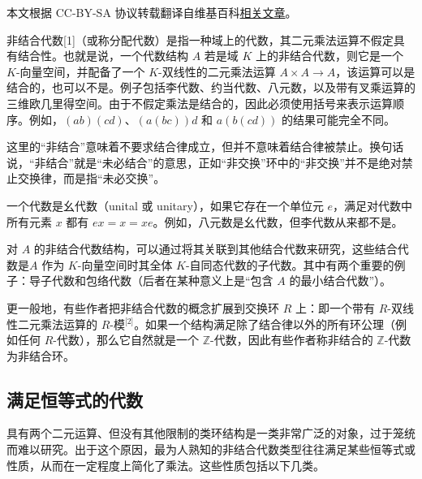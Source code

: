 
本文根据 CC-BY-SA 协议转载翻译自维基百科\href{https://en.wikipedia.org/wiki/Non-associative_algebra}{相关文章}。

非结合代数[1]（或称分配代数）是指一种域上的代数，其二元乘法运算不假定具有结合性。也就是说，一个代数结构 $A$ 若是域 $K$ 上的非结合代数，则它是一个 $K$-向量空间，并配备了一个 $K$-双线性的二元乘法运算 $A \times A \to A$，该运算可以是结合的，也可以不是。例子包括李代数、约当代数、八元数，以及带有叉乘运算的三维欧几里得空间。由于不假定乘法是结合的，因此必须使用括号来表示运算顺序。例如，$(ab)(cd)$、$(a(bc))d$ 和 $a(b(cd))$ 的结果可能完全不同。

这里的“非结合”意味着不要求结合律成立，但并不意味着结合律被禁止。换句话说，“非结合”就是“未必结合”的意思，正如“非交换”环中的“非交换”并不是绝对禁止交换律，而是指“未必交换”。

一个代数是幺代数（unital 或 unitary），如果它存在一个单位元 $e$，满足对代数中所有元素 $x$ 都有 $ex = x = xe$。例如，八元数是幺代数，但李代数从来都不是。

对 $A$ 的非结合代数结构，可以通过将其关联到其他结合代数来研究，这些结合代数是$A$ 作为 $K$-向量空间时其全体 $K$-自同态代数的子代数。其中有两个重要的例子：导子代数和包络代数（后者在某种意义上是“包含 $A$ 的最小结合代数”）。

更一般地，有些作者把非结合代数的概念扩展到交换环 $R$ 上：即一个带有 $R$-双线性二元乘法运算的 $R$-模\(^\text{[2]}\)。如果一个结构满足除了结合律以外的所有环公理（例如任何 $R$-代数），那么它自然就是一个 $\mathbb{Z}$-代数，因此有些作者称非结合的 $\mathbb{Z}$-代数为非结合环。
\subsection{满足恒等式的代数}
具有两个二元运算、但没有其他限制的类环结构是一类非常广泛的对象，过于笼统而难以研究。出于这个原因，最为人熟知的非结合代数类型往往满足某些恒等式或性质，从而在一定程度上简化了乘法。这些性质包括以下几类。
